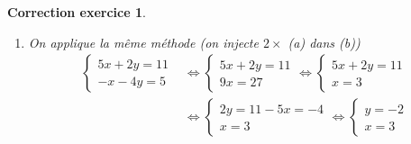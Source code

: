 \documentclass[12pt]{article}
\newtheorem{correction}{\bf Correction exercice}
\newenvironment{cor}{
\begin{correction}\smallskip\normalfont}{\end{correction}
}
\begin{document}
\begin{cor}
\begin{enumerate}
\begin{align*}
    \right.
  \end{align*}
  \item
  On applique la m\^eme m\'ethode (on injecte $2 \times$ (a) dans (b))
  \begin{align*}
    \left\{
      \begin{array}{l}
        5x + 2y = 11
        \\
        -x - 4y = 5
      \end{array}
    \right.
    &\iff
    \left\{
      \begin{array}{l}
        5x + 2y = 11
        \\
        9x  = 27
      \end{array}
    \right.
    \iff
    \left\{
      \begin{array}{l}
        5x + 2y = 11
        \\
        x  = 3
      \end{array}
    \right.
    \\
    &\iff
    \left\{
      \begin{array}{l}
        2y = 11 - 5x = -4
        \\
        x  = 3
      \end{array}
    \right.
    \iff
    \left\{
      \begin{array}{l}
        y = -2
        \\
        x  = 3
      \end{array}
    \right.
  \end{align*}
\end{enumerate}
\end{cor}
\color{black}
\fi

\end{document}
